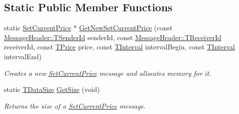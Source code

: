 \subsection*{Static Public Member Functions}
\begin{DoxyCompactItemize}
\item 
static \hyperlink{class_terra_swarm_1_1_synchronous_1_1_set_current_price}{Set\-Current\-Price} $\ast$ \hyperlink{class_terra_swarm_1_1_synchronous_1_1_set_current_price_a4f796519e90280eb712adabec444493e}{Get\-New\-Set\-Current\-Price} (const \hyperlink{class_terra_swarm_1_1_message_header_a516b36855e2aad7cfbf8770f1b42784f}{Message\-Header\-::\-T\-Sender\-Id} sender\-Id, const \hyperlink{class_terra_swarm_1_1_message_header_aa3260702b182b6f88ddbdd3416e98df0}{Message\-Header\-::\-T\-Receiver\-Id} receiver\-Id, const \hyperlink{class_terra_swarm_1_1_synchronous_1_1_set_current_price_a2ed14f2a90070d19a70183bb63e7708e}{T\-Price} price, const \hyperlink{class_terra_swarm_1_1_synchronous_1_1_set_current_price_aa87902078a0788d13ef70b899d83f4d3}{T\-Interval} interval\-Begin, const \hyperlink{class_terra_swarm_1_1_synchronous_1_1_set_current_price_aa87902078a0788d13ef70b899d83f4d3}{T\-Interval} interval\-End)
\begin{DoxyCompactList}\small\item\em Creates a new \hyperlink{class_terra_swarm_1_1_synchronous_1_1_set_current_price}{Set\-Current\-Price} message and allocates memory for it. \end{DoxyCompactList}\item 
static \hyperlink{namespace_terra_swarm_a092e6ec9739175076ae3106783f5c1b6}{T\-Data\-Size} \hyperlink{class_terra_swarm_1_1_synchronous_1_1_set_current_price_a32e1cebec60aa525dbb32025b4201b43}{Get\-Size} (void)
\begin{DoxyCompactList}\small\item\em Returns the size of a \hyperlink{class_terra_swarm_1_1_synchronous_1_1_set_current_price}{Set\-Current\-Price} message. \end{DoxyCompactList}\end{DoxyCompactItemize}
